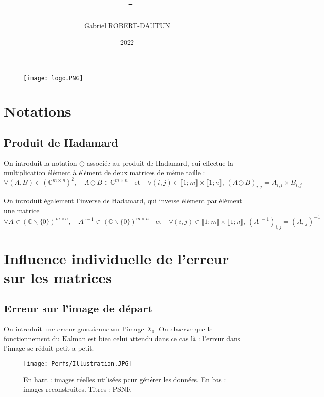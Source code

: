\documentclass[titlepage]{article}
\author{Gabriel ROBERT-DAUTUN}
\date{2022}
\title{%
	\UE\, - \type\ifthenelse{\nb > 0}{\nb}{} \\
	\large \sbt}
\newcommand{\hinv}[1]{#1^{\circ-1}}
\begin{document}
	
	\begin{figure}
		\centering
		\texttt{[image: logo.PNG]}
		\label{fig:logo}
	\end{figure}
	\maketitle
	
	\newpage
	\tableofcontents
	
	\newpage
	\section{Notations}
	\subsection{Produit de Hadamard}
	
	On introduit la notation $\odot$ associée au produit de Hadamard, qui effectue la multiplication élément à élément de deux matrices de même taille :
	$$
	\forall (A,B)\in\left(\mathbb{C}^{m\times n}\right)^2, \quad A\odot B\in\mathbb{C}^{m\times n} \quad\text{et}\quad \forall (i,j)\in\llbracket1;m\rrbracket\times\llbracket1;n\rrbracket,\, (A\odot B)_{i,j} = A_{i,j}\times B_{i,j}
	$$
	
	On introduit également l'inverse de Hadamard, qui inverse élément par élément une matrice
	$$
		\forall A \in \left(\mathbb{C}\backslash\{0\}\right)^{m\times n},\quad \hinv{A}\in\left(\mathbb{C}\backslash\{0\}\right)^{m\times n} \quad\text{et}\quad \forall (i,j)\in\llbracket1;m\rrbracket\times\llbracket1;n\rrbracket,\, \left(\hinv{A}\right)_{i,j} = \left(A_{i,j}\right)^{-1}
	$$ 
	
	\newpage
	\section{Influence individuelle de l'erreur sur les matrices}
	\subsection{Erreur sur l'image de départ}
	On introduit une erreur gaussienne sur l'image $X_0$. On observe que le fonctionnement du Kalman est bien celui attendu dans ce cas là : l'erreur dans l'image se réduit petit a petit.
	
	\begin{figure}[H]
		\centering
		\texttt{[image: Perfs/Illustration.JPG]}
		\caption{En haut : images réelles utilisées pour générer les données. En bas : images reconstruites. Titres : PSNR}
	\end{figure}
\end{document}
